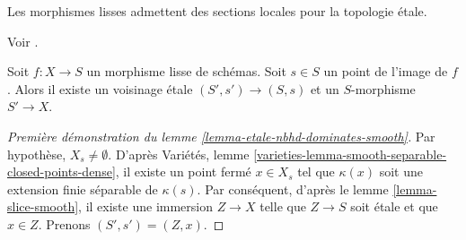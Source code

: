 \begin{lemma}
\label{lemma-etale-nbhd-dominates-smooth}
\begin{slogan}
Les morphismes lisses admettent des sections locales pour la topologie \'etale.
\end{slogan}
\begin{reference}
Voir \cite[Corollaire 17.16.3 (ii)]{EGA4}.
\end{reference}
Soit $f : X \to S$ un morphisme lisse de schémas.
Soit $s \in S$ un point de l'image de $f$.
Alors il existe un voisinage \'etale $(S', s') \to (S, s)$
et un $S$-morphisme $S' \to X$.
\end{lemma}

\begin{proof}[Première démonstration du lemme \ref{lemma-etale-nbhd-dominates-smooth}]
Par hypothèse, $X_s \not = \emptyset$. D'après
Variétés, lemme \ref{varieties-lemma-smooth-separable-closed-points-dense},
il existe un point fermé $x \in X_s$ tel que $\kappa(x)$
soit une extension finie séparable de $\kappa(s)$.
Par conséquent, d'après le
lemme \ref{lemma-slice-smooth},
il existe une immersion $Z \to X$ telle que $Z \to S$ soit \'etale et
que $x \in Z$. Prenons $(S' , s') = (Z, x)$.
\end{proof}

